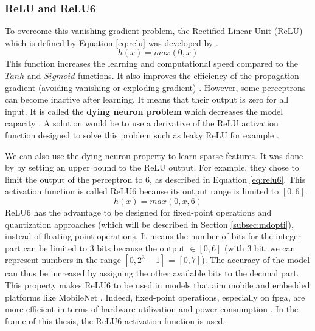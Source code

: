 \subsubsection{ReLU and ReLU6}
To overcome this vanishing gradient problem, the Rectified Linear Unit (ReLU) which is defined by Equation \eqref{eq:relu} was developed by \textcite{krizhevsky_imagenet_2012}.
%
\begin{equation}
    h(x) = max(0, x)
    \label{eq:relu}
\end{equation}
%
This function increases the learning and computational speed compared to the $Tanh$ and $Sigmoid$ functions. It also improves the efficiency of the propagation gradient (avoiding vanishing or exploding gradient) \cite{abdelouahab_accelerating_2018, maas_rectier_2013}. However, some perceptrons can become inactive after learning. It means that their output is zero for all input. It is called the \textbf{dying neuron problem} which decreases the model capacity \cite{matteucci_artificial_2019}. A solution would be to use a derivative of the ReLU activation function designed to solve this problem such as leaky ReLU for example \cite{matteucci_artificial_2019, maas_rectier_2013}.

We can also use the dying neuron property to learn sparse features. It was done by \textcite{krizhevsky_convolutional_2010} by setting an upper bound to the ReLU output. For example, they chose to limit the output of the perceptron to 6, as described in Equation \eqref{eq:relu6}. This activation function is called ReLU6 because its output range is limited to $[0, 6]$. 
%
\begin{equation}
    h(x) = max(0, x, 6)
    \label{eq:relu6}
\end{equation}
%
ReLU6 has the advantage to be designed for fixed-point operations and quantization approaches (which will be described in Section \ref{subsec:mdopti}), instead of floating-point operations. It means the number of bits for the integer part can be limited to 3 bits because the output $ \in [0, 6]$ (with 3 bit, we can represent numbers in the range $[0, 2^3-1]$ = $[0, 7]$). The accuracy of the model can thus be increased by assigning the other available bits to the decimal part. This property makes ReLU6 to be used in models that aim mobile and embedded platforms like MobileNet \cite{howard_mobilenets_2017}. Indeed, fixed-point operations, especially on \acrshort{fpga}, are more efficient in terms of hardware utilization and power consumption \cite{david_hardware_2007}. In the frame of this thesis, the ReLU6 activation function is used.

